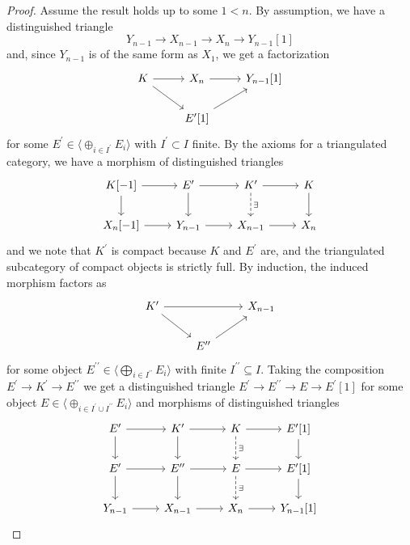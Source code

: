\documentclass[10pt]{amsart}
\begin{document}
\begin{lem}
\begin{proof}
    Assume the result holds up to some $1 < n$.
    By assumption, we have a distinguished triangle
    $$Y_{n-1} \rightarrow X_{n-1} \rightarrow X_{n} \rightarrow Y_{n-1}[1]$$
    and, since $Y_{n-1}$ is of the same form as $X_1$, we get a factorization
    $$\begin{tikzcd}
      K \arrow{rd}\arrow{r} & X_n \arrow{r} & Y_{n-1}[1]\\
      & E^\prime[1]\arrow{ur}
    \end{tikzcd}$$
    for some $E^\prime \in \langle \oplus_{i \in I^\prime}E_i \rangle$ with $I^\prime \subset I$ finite.
    By the axioms for a triangulated category, we have a morphism of distinguished triangles
    $$\begin{tikzcd}
      K[-1] \arrow{d}\arrow{r} & E^\prime \arrow{r}\arrow{d} & K^\prime \arrow{r}\arrow[dashed]{d}{\exists} & K\arrow{d}\\
      X_n[-1] \arrow{r} & Y_{n-1} \arrow{r} & X_{n-1} \arrow{r} & X_n
    \end{tikzcd}$$
    and we note that $K^\prime$ is compact because $K$ and $E^\prime$ are, and the triangulated subcategory of compact objects is strictly full.
    By induction, the induced morphism factors as
    $$\begin{tikzcd}
      K^\prime \arrow{rr}\arrow{rd} & & X_{n-1}\\
      & E^{\prime\prime}\arrow{ur}
    \end{tikzcd}$$
    for some object $E^{\prime\prime} \in \langle \bigoplus_{i \in I^{\prime\prime}} E_i \rangle$ with finite $I^{\prime\prime} \subseteq I$.
    Taking the composition $E^\prime \rightarrow K^\prime \rightarrow E^{\prime\prime}$ we get a distinguished triangle $E^\prime \rightarrow E^{\prime\prime} \rightarrow E \rightarrow E^\prime[1]$ for some object $E \in \langle \oplus_{i \in I^\prime \cup I^{\prime\prime}}E_i\rangle$ and morphisms of distinguished triangles
    $$\begin{tikzcd}
      E^\prime \arrow{r}\arrow{d} & K^\prime \arrow{r}\arrow{d} & K \arrow{r}\arrow[dashed]{d}{\exists} & E^\prime[1]\arrow{d}\\
      E^\prime \arrow{r}\arrow{d} & E^{\prime\prime} \arrow{r}\arrow{d} & E \arrow{r}\arrow[dashed]{d}{\exists} & E^\prime[1]\arrow{d}\\
      Y_{n-1} \arrow{r} & X_{n-1} \arrow{r} & X_n \arrow{r} & Y_{n-1}[1]
    \end{tikzcd}$$
    

\end{proof}
\end{lem}
\end{document}
